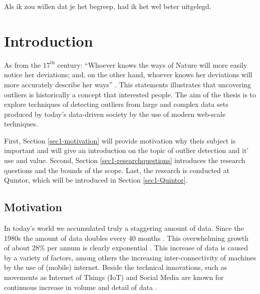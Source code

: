 \begin{savequote}[78mm] 
Als ik zou willen dat je het begreep, had ik het wel beter uitgelegd.  
\end{savequote}

\chapter{Introduction \label{chap1:introduction}}

As from the $17^{\text{th}}$ century: ``Whoever knows the ways of Nature will more easily notice her deviations; and, on the other hand, whoever knows her deviations will more accurately describe her ways'' \cite{bacon2010novum}. This statements illustrates that uncovering outliers is historically a concept that interested people. The aim of the thesis is to explore techniques of detecting outliers from large and complex data sets produced by today's data-driven society by the use of modern web-scale techniques.

First, Section \ref{sec1-motivation} will provide motivation why theis subject is important and will give an introduction on the topic of outlier detection and it' use and value. Second, Section \ref{sec1-researchquestions} introduces the research questions and the bounds of the scope. Last, the research is conducted at Quintor, which will be introduced in Section \ref{sec1-Quintor}. 

\section{Motivation \label{sec1-motivation}}
In today's world we accumulated truly a staggering amount of data. Since the 1980s the amount of data doubles every 40 months \cite{Hilbert01042011}. This overwhelming growth of about 28\% per annum is clearly exponential \cite{6479953}. This increase of data is caused by a variety of factors, among others the increasing inter-connectivity of machines by the use of (mobile) internet. Beside the technical innovations, such as movements as Internet of Things (IoT) and Social Media are known for continuous increase in volume and detail of data \cite{holler2014from}. 

